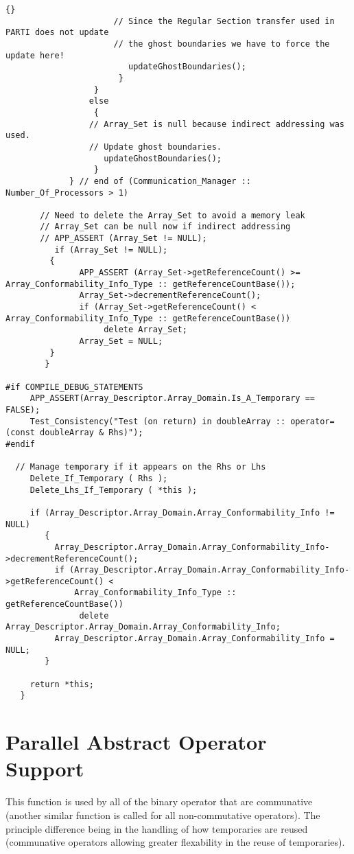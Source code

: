 \documentclass[10pt]{llncs}
\begin{document}
\begin{lstlisting}{}
                      // Since the Regular Section transfer used in PARTI does not update
                      // the ghost boundaries we have to force the update here!
                         updateGhostBoundaries();
                       }
                  }
                 else
                  {
                 // Array_Set is null because indirect addressing was used. 
                 // Update ghost boundaries.
                    updateGhostBoundaries();
                  }
             } // end of (Communication_Manager :: Number_Of_Processors > 1)

       // Need to delete the Array_Set to avoid a memory leak
       // Array_Set can be null now if indirect addressing
       // APP_ASSERT (Array_Set != NULL);
          if (Array_Set != NULL);
	     {
               APP_ASSERT (Array_Set->getReferenceCount() >= Array_Conformability_Info_Type :: getReferenceCountBase());
               Array_Set->decrementReferenceCount();
               if (Array_Set->getReferenceCount() < Array_Conformability_Info_Type :: getReferenceCountBase())
                    delete Array_Set;
               Array_Set = NULL;
	     }
        }

#if COMPILE_DEBUG_STATEMENTS
     APP_ASSERT(Array_Descriptor.Array_Domain.Is_A_Temporary == FALSE);
     Test_Consistency("Test (on return) in doubleArray :: operator= (const doubleArray & Rhs)");
#endif

  // Manage temporary if it appears on the Rhs or Lhs
     Delete_If_Temporary ( Rhs );
     Delete_Lhs_If_Temporary ( *this );

     if (Array_Descriptor.Array_Domain.Array_Conformability_Info != NULL)
        {
          Array_Descriptor.Array_Domain.Array_Conformability_Info->decrementReferenceCount();
          if (Array_Descriptor.Array_Domain.Array_Conformability_Info->getReferenceCount() <
              Array_Conformability_Info_Type :: getReferenceCountBase())
               delete Array_Descriptor.Array_Domain.Array_Conformability_Info;
          Array_Descriptor.Array_Domain.Array_Conformability_Info = NULL;
        }

     return *this;
   }
\end{lstlisting}

\newpage
\section{Parallel Abstract Operator Support}

 This function is used by all of the binary operator that are communative
(another similar function is called for all non-commutative operators).
The principle difference being in the handling of how temporaries are reused
(communative operators allowing greater flexability in the reuse of temporaries).
\end{document}
